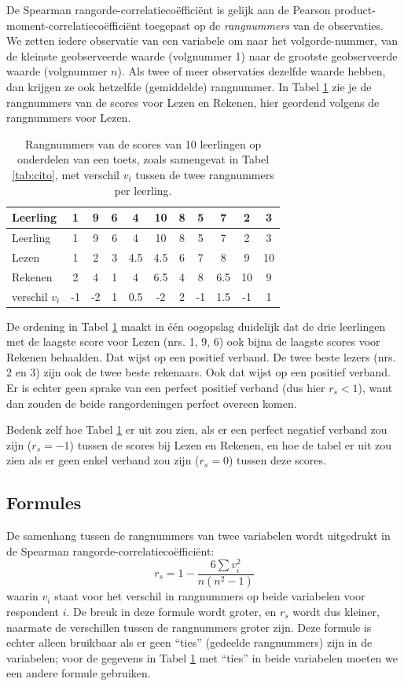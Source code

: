 \documentclass[
]{book}
\begin{document}
De Spearman rangorde-correlatiecoëfficiënt is gelijk aan de Pearson
product-moment-correlatiecoëfficiënt toegepast op de \emph{rangnummers} van de
observaties. We zetten iedere observatie van een variabele om naar het
volgorde-nummer, van de kleinste geobserveerde waarde (volgnummer 1)
naar de grootste geobserveerde waarde (volgnummer \(n\)). Als twee of meer
observaties dezelfde waarde hebben, dan krijgen ze ook hetzelfde
(gemiddelde) rangnummer. In
Tabel \ref{tab:cito-rangnummers} zie je de rangnummers van de scores
voor Lezen en Rekenen, hier geordend volgens de rangnummers voor Lezen.

\begin{longtable}[]{@{}lcccccccccc@{}}
\caption{\label{tab:cito-rangnummers} Rangnummers van de scores van 10 leerlingen op onderdelen van een toets, zoals samengevat in Tabel \ref{tab:cito}, met verschil \(v_i\) tussen de twee rangnummers per leerling.}\tabularnewline
\toprule
Leerling & 1 & 9 & 6 & 4 & 10 & 8 & 5 & 7 & 2 & 3\tabularnewline
\midrule
\endfirsthead
\toprule
Leerling & 1 & 9 & 6 & 4 & 10 & 8 & 5 & 7 & 2 & 3\tabularnewline
\midrule
\endhead
Lezen & 1 & 2 & 3 & 4.5 & 4.5 & 6 & 7 & 8 & 9 & 10\tabularnewline
Rekenen & 2 & 4 & 1 & 4 & 6.5 & 4 & 8 & 6.5 & 10 & 9\tabularnewline
verschil \(v_i\) & -1 & -2 & 1 & 0.5 & -2 & 2 & -1 & 1.5 & -1 & 1\tabularnewline
\bottomrule
\end{longtable}

De ordening in Tabel \ref{tab:cito-rangnummers} maakt in één oogopslag duidelijk dat
de drie leerlingen met de laagste score voor Lezen (nrs. 1, 9, 6) ook
bijna de laagste scores voor Rekenen behaalden. Dat wijst op een
positief verband. De twee beste lezers (nrs. 2 en 3) zijn ook de twee
beste rekenaars. Ook dat wijst op een positief verband. Er is echter
geen sprake van een perfect positief verband (dus hier \(r_s<1\)), want
dan zouden de beide rangordeningen perfect overeen komen.

Bedenk zelf hoe Tabel \ref{tab:cito-rangnummers} er uit zou zien, als er een perfect
negatief verband zou zijn (\(r_s=-1\)) tussen de scores bij Lezen en
Rekenen, en hoe de tabel er uit zou zien als er geen enkel verband zou
zijn (\(r_s=0\)) tussen deze scores.

\hypertarget{formules-4}{%
\subsection{Formules}\label{formules-4}}

De samenhang tussen de rangnummers van twee variabelen wordt uitgedrukt
in de Spearman rangorde-correlatiecoëfficiënt:
\begin{equation}
    r_s = 1 - \frac{6 \sum v_i^2}{n(n^2-1)}
  \label{eq:spearman}
\end{equation}
waarin \(v_i\) staat voor
het verschil in rangnummers op beide variabelen voor respondent \(i\). De
breuk in deze formule wordt groter, en \(r_s\) wordt dus kleiner, naarmate
de verschillen tussen de rangnummers groter zijn.
Deze formule is echter alleen bruikbaar als er geen ``ties'' (gedeelde rangnummers) zijn in de variabelen; voor de gegevens in Tabel \ref{tab:cito-rangnummers} met ``ties'' in beide variabelen moeten we een andere formule gebruiken.
\end{document}
